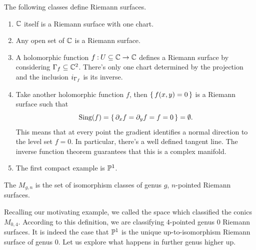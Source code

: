 \documentclass[12pt]{memoir}
\begin{document}
\begin{Ex}
        The following classes define Riemann surfaces.
        \begin{enumerate}
        \item $\mathbb{C}$ itself is a Riemann surface with one chart.
        \item Any open set of $\mathbb{C}$ is a Riemann surface.
        \item A holomorphic function $f\mathbin{:} U\subseteq\mathbb{C}\to\mathbb{C}$ defines a Riemann surface by considering $\Gamma_f\subseteq\mathbb{C}^2$. There's only one chart determined by the projection and the inclusion $i_{\Gamma_f}$ is its inverse.
        \item Take another holomorphic function $f$, then $\{\,f(x,y)=0\,\}$ is a Riemann surface such that 
        $$\text{Sing}(f)=\{\,\partial_xf=\partial_yf=f=0\,\}=\emptyset.$$
        This means that at every point the gradient identifies a normal direction to the level set $f=0$. In particular, there's a well defined tangent line. The inverse function theorem guarantees that this is a complex manifold. 
        \item The first compact example is $\mathbb{P}^1$.
        \end{enumerate}
\end{Ex} 

\begin{Def}
    The  $M_{g,n}$ is the set of isomorphism classes of genus $g$, $n$-pointed Riemann surfaces.
\end{Def}

Recalling our motivating example, we called the space which classified the conics $M_{0,4}$. According to this definition, we are classifying $4$-pointed genus 0 Riemann surfaces. It is indeed the case that $\mathbb{P}^1$ is the unique up-to-isomorphism Riemann surface of genus 0. Let us explore what happens in further genus higher up.
\end{document}
